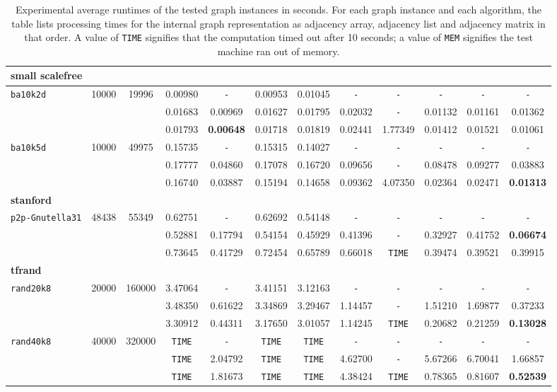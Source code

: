 \begin{table}
{\begin{tabular}{ l c c | c c c c c c c c c }
\hline
\multicolumn{12}{l}{\textbf{small scalefree}} \\
\hline
\verb|ba10k2d| & 10000 & 19996 & 0.00980 & \verb|-| & 0.00953 & 0.01045 & \verb|-| & \verb|-| & \verb|-| & \verb|-| & \verb|-| \\
 &  &  & 0.01683 & 0.00969 & 0.01627 & 0.01795 & 0.02032 & \verb|-| & 0.01132 & 0.01161 & 0.01362 \\
 &  &  & 0.01793 & \textbf{0.00648} & 0.01718 & 0.01819 & 0.02441 & 1.77349 & 0.01412 & 0.01521 & 0.01061 \\
\hline
\verb|ba10k5d| & 10000 & 49975 & 0.15735 & \verb|-| & 0.15315 & 0.14027 & \verb|-| & \verb|-| & \verb|-| & \verb|-| & \verb|-| \\
 &  &  & 0.17777 & 0.04860 & 0.17078 & 0.16720 & 0.09656 & \verb|-| & 0.08478 & 0.09277 & 0.03883 \\
 &  &  & 0.16740 & 0.03887 & 0.15194 & 0.14658 & 0.09362 & 4.07350 & 0.02364 & 0.02471 & \textbf{0.01313} \\
\hline
\multicolumn{12}{l}{\textbf{stanford}} \\
\hline
\verb|p2p-Gnutella31| & 48438 & 55349 & 0.62751 & \verb|-| & 0.62692 & 0.54148 & \verb|-| & \verb|-| & \verb|-| & \verb|-| & \verb|-| \\
 &  &  & 0.52881 & 0.17794 & 0.54154 & 0.45929 & 0.41396 & \verb|-| & 0.32927 & 0.41752 & \textbf{0.06674} \\
 &  &  & 0.73645 & 0.41729 & 0.72454 & 0.65789 & 0.66018 & \verb|TIME| & 0.39474 & 0.39521 & 0.39915 \\
\hline
\multicolumn{12}{l}{\textbf{tfrand}} \\
\hline
\verb|rand20k8| & 20000 & 160000 & 3.47064 & \verb|-| & 3.41151 & 3.12163 & \verb|-| & \verb|-| & \verb|-| & \verb|-| & \verb|-| \\
 &  &  & 3.48350 & 0.61622 & 3.34869 & 3.29467 & 1.14457 & \verb|-| & 1.51210 & 1.69877 & 0.37233 \\
 &  &  & 3.30912 & 0.44311 & 3.17650 & 3.01057 & 1.14245 & \verb|TIME| & 0.20682 & 0.21259 & \textbf{0.13028} \\
\hline
\verb|rand40k8| & 40000 & 320000 & \verb|TIME| & \verb|-| & \verb|TIME| & \verb|TIME| & \verb|-| & \verb|-| & \verb|-| & \verb|-| & \verb|-| \\
 &  &  & \verb|TIME| & 2.04792 & \verb|TIME| & \verb|TIME| & 4.62700 & \verb|-| & 5.67266 & 6.70041 & 1.66857 \\
 &  &  & \verb|TIME| & 1.81673 & \verb|TIME| & \verb|TIME| & 4.38424 & \verb|TIME| & 0.78365 & 0.81607 & \textbf{0.52539} \\
\hline
  \end{tabular}
}
\caption{Experimental average runtimes of the tested graph instances in seconds. For each graph instance and each algorithm, the table lists processing times for the internal graph representation as adjacency array, adjacency list and adjacency matrix in that order. A value of \texttt{TIME} signifies that the computation timed out after 10 seconds; a value of \texttt{MEM} signifies the test machine ran out of memory.}
\label{results}
\end{table}

